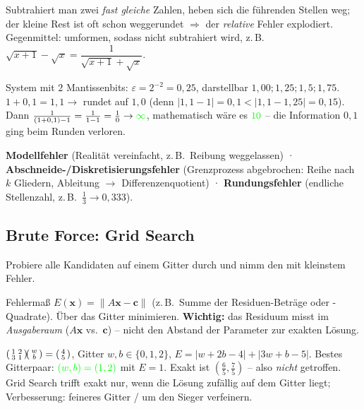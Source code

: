 \documentclass[a4paper,11pt]{article}
\newenvironment{psmallmatrix}{\left(\begin{smallmatrix}}{\end{smallmatrix}\right)}
\newcommand{\f}[1]{\textcolor{green}{#1}}
\begin{document}
\begin{merke}
Subtrahiert man zwei \emph{fast gleiche} Zahlen, heben sich die führenden Stellen weg; der kleine Rest
ist oft schon weggerundet $\Rightarrow$ der \emph{relative} Fehler explodiert. Gegenmittel: umformen,
sodass nicht subtrahiert wird, z.\,B.\ $\sqrt{x+1}-\sqrt x=\dfrac{1}{\sqrt{x+1}+\sqrt x}$.
\end{merke}

\begin{beispiel}
System mit $2$ Mantissenbits: $\varepsilon=2^{-2}=0{,}25$, darstellbar $1{,}00;1{,}25;1{,}5;1{,}75$.
$1+0{,}1=1{,}1\to$ rundet auf $1{,}0$ (denn $|1{,}1-1|=0{,}1<|1{,}1-1{,}25|=0{,}15$).
Dann $\frac{1}{(1+0{,}1)-1}=\frac{1}{1-1}=\frac10\to\f{\infty}$, mathematisch wäre es $\f{10}$ --
die Information $0{,}1$ ging beim Runden verloren.
\end{beispiel}

\begin{formel}
\textbf{Modellfehler} (Realität vereinfacht, z.\,B.\ Reibung weggelassen) \;·\;
\textbf{Abschneide-/Diskretisierungsfehler} (Grenzprozess abgebrochen: Reihe nach $k$ Gliedern,
Ableitung $\to$ Differenzenquotient) \;·\;
\textbf{Rundungsfehler} (endliche Stellenzahl, z.\,B.\ $\tfrac13\to0{,}333$).
\end{formel}

\subsection{Brute Force: Grid Search}
Probiere alle Kandidaten auf einem Gitter durch und nimm den mit kleinstem Fehler.
\begin{formel}[Grid Search für $A\mathbf x=\mathbf c$]
Fehlermaß $E(\mathbf x)=\|A\mathbf x-\mathbf c\|$ (z.\,B.\ Summe der Residuen-Beträge oder -Quadrate).
Über das Gitter minimieren. \textbf{Wichtig:} das Residuum misst im \emph{Ausgaberaum} ($A\mathbf
x$ vs.\ $\mathbf c$) -- nicht den Abstand der Parameter zur exakten Lösung.
\end{formel}
\begin{beispiel}
$\begin{psmallmatrix}1&2\\3&1\end{psmallmatrix}\!\begin{psmallmatrix}w\\b\end{psmallmatrix}
=\begin{psmallmatrix}4\\5\end{psmallmatrix}$, Gitter $w,b\in\{0,1,2\}$,
$E=|w+2b-4|+|3w+b-5|$. Bestes Gitterpaar: $\f{(w,b)=(1,2)}$ mit $E=1$. Exakt ist
$(\tfrac65,\tfrac75)$ -- also \emph{nicht} getroffen. Grid Search trifft exakt nur, wenn die Lösung
zufällig auf dem Gitter liegt; Verbesserung: feineres Gitter / um den Sieger verfeinern.
\end{beispiel}
\end{document}
